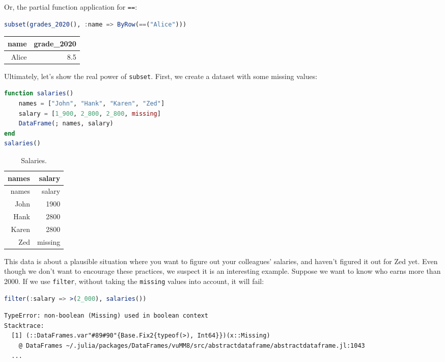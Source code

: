 \documentclass[
  notoc %
]{tufte-book}
\newcommand{\passthrough}[1]{#1}
\begin{document}
Or, the partial function application for \passthrough{\lstinline!==!}:

\begin{lstlisting}[language=Julia]
subset(grades_2020(), :name => ByRow(==("Alice")))
\end{lstlisting}

\begin{longtable}[]{@{}rr@{}}
\toprule
name & grade\_2020 \\
\midrule
\endhead
Alice & 8.5 \\
\bottomrule
\end{longtable}

Ultimately, let's show the real power of
\passthrough{\lstinline!subset!}. First, we create a dataset with some
missing values:

\begin{lstlisting}[language=Julia]
function salaries()
    names = ["John", "Hank", "Karen", "Zed"]
    salary = [1_900, 2_800, 2_800, missing]
    DataFrame(; names, salary)
end
salaries()
\end{lstlisting}

\hypertarget{tbl:salaries}{}
\begin{longtable}[]{@{}rr@{}}
\caption{\label{tbl:salaries}Salaries.}\tabularnewline
\toprule
names & salary \\
\midrule
\endfirsthead
\toprule
names & salary \\
\midrule
\endhead
John & 1900 \\
Hank & 2800 \\
Karen & 2800 \\
Zed & missing \\
\bottomrule
\end{longtable}

This data is about a plausible situation where you want to figure out
your colleagues' salaries, and haven't figured it out for Zed yet. Even
though we don't want to encourage these practices, we suspect it is an
interesting example. Suppose we want to know who earns more than 2000.
If we use \passthrough{\lstinline!filter!}, without taking the
\passthrough{\lstinline!missing!} values into account, it will fail:

\begin{lstlisting}[language=Julia]
filter(:salary => >(2_000), salaries())
\end{lstlisting}

\begin{lstlisting}[language=Output]
TypeError: non-boolean (Missing) used in boolean context
Stacktrace:
  [1] (::DataFrames.var"#89#90"{Base.Fix2{typeof(>), Int64}})(x::Missing)
    @ DataFrames ~/.julia/packages/DataFrames/vuMM8/src/abstractdataframe/abstractdataframe.jl:1043
  ...
\end{lstlisting}
\end{document}
